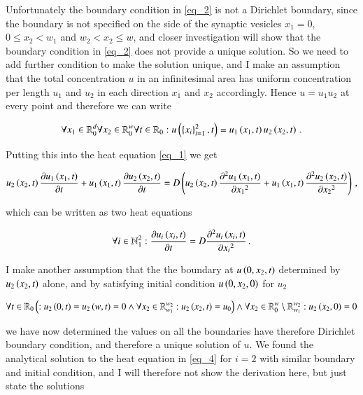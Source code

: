 \documentclass[11pt,english,a4paper]{article}
\begin{document}
\begin{flushleft}
Unfortunately the boundary condition in \eqref{eq_2} is not a Dirichlet boundary, since the boundary is not specified on the side of the synaptic vesicles $x_1=0$, $0\leq x_2 < w_1$ and $w_2 < x_2 \leq w$, and closer investigation will show that the boundary condition in \eqref{eq_2} does not provide a unique solution. So we need to add further condition to make the solution unique, and I make an assumption that the total concentration $u$ in an infinitesimal area has uniform concentration per length $u_1$ and $u_2$ in each direction $x_1$ and $x_2$ accordingly. Hence $u=u_1 u_2$ at every point and therefore we can write

\begin{align}
\forall x_1 \in \mathbb{R}_0^d \forall x_2 \in \mathbb{R}_0^w \forall t \in \mathbb{R}_{0}: u\left({\left\lbrace{x_i}\right\rbrace_{i=1}^2,t}\right) = u_1\left({x_1,t}\right) u_2\left({x_2,t}\right) \,.
\label{eq_3}
\end{align}

Putting this into the heat equation \eqref{eq_1} we get

\begin{align*}
u_2\left({x_2,t}\right)\frac{\partial u_1\left({x_1,t}\right)}{\partial t} + u_1\left({x_1,t}\right)\frac{\partial u_2\left({x_2,t}\right)}{\partial t} = D\left({u_2\left({x_2,t}\right)\frac{\partial^2 u_1\left({x_1,t}\right)}{\partial {x_1}^2} + u_1\left({x_1,t}\right)\frac{\partial^2 u_2\left({x_2,t}\right)}{\partial {x_2}^2}}\right) \,,
\end{align*}

which can be written as two heat equations

\begin{align}
\forall i \in \mathbb{N}_1^2 : \frac{\partial u_i\left({x_i,t}\right)}{\partial t}  = D \frac{\partial^2 u_i\left({x_i,t}\right)}{\partial {x_i}^2} \,.
\label{eq_4}
\end{align}

I make another assumption that the the boundary at $u\left({0,x_2,t}\right)$ determined by $u_2\left({x_2,t}\right)$ alone, and by satisfying initial condition $u\left({0,x_2,0}\right)$ for $u_2$

\begin{align}
\forall t \in \mathbb{R}_0 \left({: u_2\left({0,t}\right) = u_2\left({w,t}\right) = 0 \wedge \forall x_2\in\mathbb{R}_{w_1}^{w_2}: u_2\left({x_2,t}\right) = u_0}\right) \wedge \forall x_2 \in\mathbb{R}_{0}^{w} \setminus \mathbb{R}_{w_1}^{w_2}: u_2\left({x_2,0}\right) = 0
\label{eq_5}
\end{align}

we have now determined the values on all the boundaries have therefore Dirichlet boundary condition, and therefore a unique solution of $u$. We found the analytical solution to the heat equation in \eqref{eq_4} for $i=2$ with similar boundary and initial condition, and I will therefore not show the derivation here, but just state the solutions


\end{flushleft}
\end{document}
